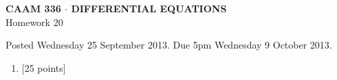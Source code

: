 \documentclass[10pt]{article}
\begin{document}
\vspace*{-5em}
\begin{center}
\large \textsf{\textbf{CAAM 336 $\cdot$ DIFFERENTIAL EQUATIONS}\\[0.5em]
Homework 20 }
\end{center}

Posted Wednesday 25 September 2013.  Due 5pm Wednesday 9 October 2013.

\begin{enumerate}\addtocounter{enumi}{19}
\item {[25 points]}  
\end{enumerate}
\end{document}

